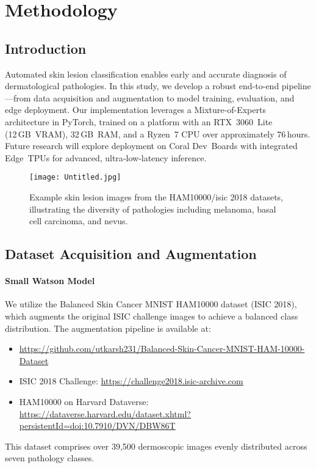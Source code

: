 \chapter{Methodology}
\clearpage

\section{Introduction}
Automated skin lesion classification enables early and accurate diagnosis of dermatological pathologies. In this study, we develop a robust end-to-end pipeline—from data acquisition and augmentation to model training, evaluation, and edge deployment. Our implementation leverages a Mixture-of-Experts architecture in PyTorch, trained on a platform with an RTX 3060 Lite (12 GB VRAM), 32 GB RAM, and a Ryzen 7 CPU over approximately 76 hours. Future research will explore deployment on Coral Dev Boards with integrated Edge TPUs for advanced, ultra‑low‑latency inference.
\begin{figure}[H]
  \centering
  \texttt{[image: Untitled.jpg]} %
  \caption{Example skin lesion images from the HAM10000/isic 2018 datasets, illustrating the diversity of pathologies including melanoma, basal cell carcinoma, and nevus.}
  \label{fig:skin-lesion-examples}
\end{figure}
\section{Dataset Acquisition and Augmentation}
\subsubsection*{Small Watson Model}
We utilize the Balanced Skin Cancer MNIST HAM10000 dataset (ISIC 2018), which augments the original ISIC challenge images to achieve a balanced class distribution. The augmentation pipeline is available at:
\begin{itemize}
  \item \url{https://github.com/utkarsh231/Balanced-Skin-Cancer-MNIST-HAM-10000-Dataset}
  \item ISIC 2018 Challenge: \url{https://challenge2018.isic-archive.com}
  \item HAM10000 on Harvard Dataverse: \url{https://dataverse.harvard.edu/dataset.xhtml?persistentId=doi:10.7910/DVN/DBW86T}
\end{itemize}
This dataset comprises over 39,500 dermoscopic images evenly distributed across seven pathology classes.


